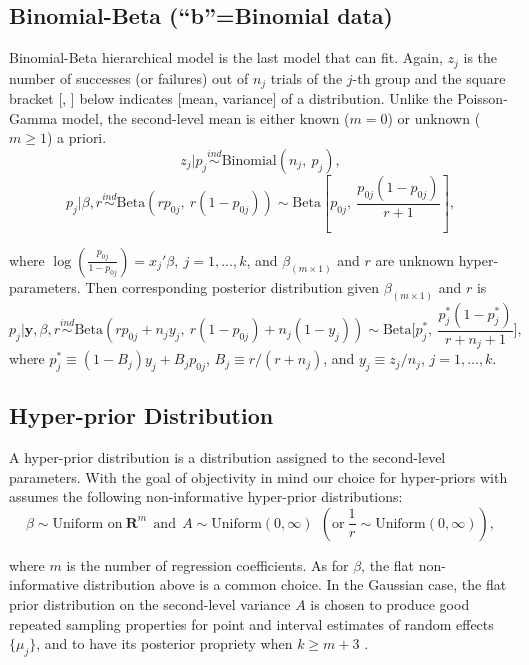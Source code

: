 \documentclass[article]{jss}
\begin{document}
\subsection[Binomial-Beta]{Binomial-Beta (``b''=Binomial data)}
Binomial-Beta hierarchical model is the last model that  can fit. Again, $z_{j}$ is the number of successes (or failures) out of $n_{j}$ trials of the $j$-th group and the square bracket [, ] below indicates [mean, variance] of a distribution. Unlike the Poisson-Gamma model, the second-level mean is either known ($m=0$) or unknown ($m\ge1$) a priori.
\begin{equation}
z_{j} \vert p_{j}\stackrel{ind}{\sim}\textrm{Binomial}(n_{j}, ~p_{j}),
\end{equation}
\begin{equation}
p_{j} \vert \beta, r\stackrel{ind}{\sim}\textrm{Beta}(rp_{0j},~ r(1-p_{0j}))\sim \textrm{Beta} \left[p_{0j}, ~\frac{p_{0j}(1-p_{0j})}{r + 1} \right],
\end{equation}

where $\log(\frac{p_{0j}}{1-p_{0j}}) =x_{j}'\beta, ~j=1, \ldots, k$, and $\beta_{(m\times1)}$ and $r$ are unknown hyper-parameters. Then corresponding posterior distribution given  $\beta_{(m\times1)}$ and $r$ is
\begin{equation} \label{betapost}
p_{j}\vert \textbf{y}, \beta, r \stackrel{ind}{\sim}\textrm{Beta}(rp_{0j}+n_{j}y_{j},~r(1-p_{0j})+n_{j}(1-y_{j}))\sim\textrm{Beta}\bigg[p^{\ast}_{j},~ \frac{p^{\ast}_{j}(1-p^{\ast}_{j})}{r+n_{j}+1}\bigg],
\end{equation}
where $p^{\ast}_{j}\equiv(1-B_{j})y_{j}+B_{j}p_{0j}$, $B_{j}\equiv r/ (r+n_{j})$, and $y_{j}\equiv z_{j} / n_{j}$, $j=1,\ldots,k$.


\subsection[Hyper-prior Distribution]{Hyper-prior Distribution}
A hyper-prior distribution is a distribution assigned to the second-level parameters. With the goal of objectivity in mind our choice for hyper-priors with  assumes the following non-informative hyper-prior distributions:
\begin{equation}
\beta \sim \textrm{Uniform on}~ \mathbf{R}^{m}~~\textrm{and}~~A \sim \textrm{Uniform}(0, \infty) ~~(\textrm{or} ~\frac{1}{r}\sim \textrm{Uniform}(0, \infty)),
\end{equation}

where $m$ is the number of regression coefficients. As for $\beta$, the flat non-informative distribution above is a common choice. In the Gaussian case, the flat prior distribution on the second-level variance $A$ is chosen to produce good repeated sampling properties for point and interval estimates of random effects $\{\mu_{j}\}$, and to have its posterior propriety when $k\ge m+3$ \citep{2011}. 
\\
\end{document}
